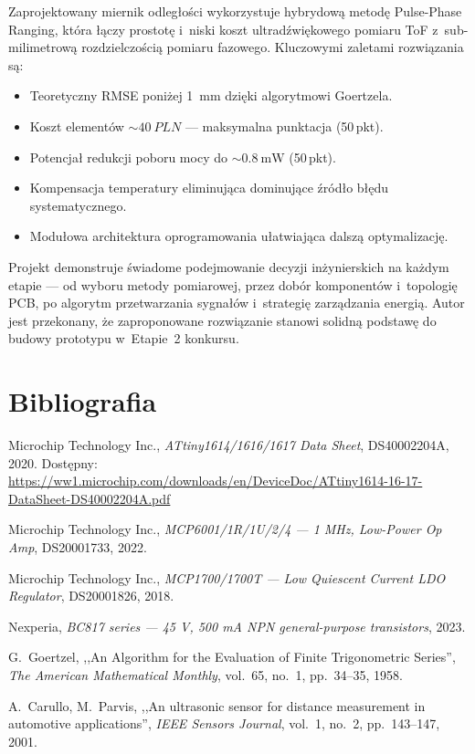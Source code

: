 \documentclass[a4paper,11pt]{article}
\begin{document}
Zaprojektowany miernik odległości wykorzystuje hybrydową metodę Pulse-Phase
Ranging, która łączy prostotę i~niski koszt ultradźwiękowego pomiaru ToF
z~sub-milimetrową rozdzielczością pomiaru fazowego. Kluczowymi zaletami
rozwiązania są:

\begin{itemize}[nosep]
    \item Teoretyczny RMSE poniżej \SI{1}{\milli\metre} dzięki algorytmowi Goertzela.
    \item Koszt elementów ${\sim}\SI{40}{PLN}$ --- maksymalna punktacja (50\,pkt).
    \item Potencjał redukcji poboru mocy do ${\sim}\SI{0,8}{\milli\watt}$ (50\,pkt).
    \item Kompensacja temperatury eliminująca dominujące źródło błędu systematycznego.
    \item Modułowa architektura oprogramowania ułatwiająca dalszą optymalizację.
\end{itemize}

Projekt demonstruje świadome podejmowanie decyzji inżynierskich na każdym
etapie --- od wyboru metody pomiarowej, przez dobór komponentów i~topologię
PCB, po algorytm przetwarzania sygnałów i~strategię zarządzania energią.
Autor jest przekonany, że zaproponowane rozwiązanie stanowi solidną podstawę
do budowy prototypu w~Etapie~2 konkursu.


\section*{Bibliografia}

\begin{enumerate}[label={[\arabic*]}, nosep]
    \item Microchip Technology Inc., \textit{ATtiny1614/1616/1617 Data Sheet},
          DS40002204A, 2020. Dostępny:
          \url{https://ww1.microchip.com/downloads/en/DeviceDoc/ATtiny1614-16-17-DataSheet-DS40002204A.pdf}
    \item Microchip Technology Inc., \textit{MCP6001/1R/1U/2/4 --- 1 MHz, Low-Power
          Op Amp}, DS20001733, 2022.
    \item Microchip Technology Inc., \textit{MCP1700/1700T --- Low Quiescent Current
          LDO Regulator}, DS20001826, 2018.
    \item Nexperia, \textit{BC817 series --- 45 V, 500 mA NPN general-purpose transistors},
          2023.
    \item G.~Goertzel, ,,An Algorithm for the Evaluation of Finite Trigonometric Series'',
          \textit{The American Mathematical Monthly}, vol.~65, no.~1, pp.~34--35, 1958.
    \item A.~Carullo, M.~Parvis, ,,An ultrasonic sensor for distance measurement
          in automotive applications'', \textit{IEEE Sensors Journal}, vol.~1, no.~2,
          pp.~143--147, 2001.
\end{enumerate}
\end{document}
